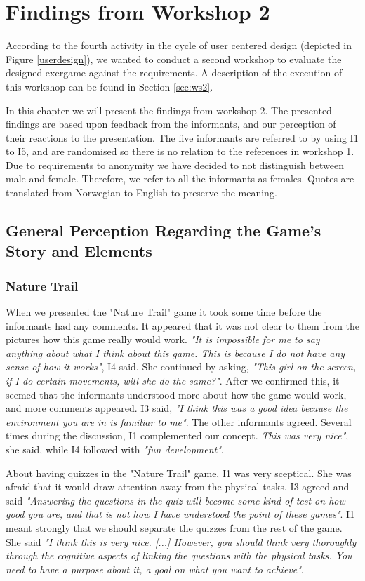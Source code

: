 \chapter{Findings from Workshop 2}
\label{chap:findW2}

According to the fourth activity in the cycle of user centered design (depicted in Figure \ref{userdesign}), we wanted to conduct a second workshop to evaluate the designed exergame against the requirements. A description of the execution of this workshop can be found in Section \ref{sec:ws2}. 

In this chapter we will present the findings from workshop 2. The presented findings are based upon feedback from the informants, and our perception of their reactions to the presentation. The five informants are referred to by using I1 to I5, and are randomised so there is no relation to the references in workshop 1. Due to requirements to anonymity we have decided to not distinguish between male and female. Therefore, we refer to all the informants as females. Quotes are translated from Norwegian to English to  preserve the meaning. 

\section{General Perception Regarding the Game's Story and Elements}

\subsection{Nature Trail}

When we presented the "Nature Trail" game it took some time before the informants had any comments. It appeared that it was not clear to them from the pictures how this game really would work. \emph{"It is impossible for me to say anything about what I think about this game. This is because I do not have any sense of how it works"}, I4 said. She continued by asking, \emph{"This girl on the screen, if I do certain movements, will she do the same?"}. After we confirmed this, it seemed that the informants understood more about how the game would work, and more comments appeared. I3 said, \emph{"I think this was a good idea because the environment you are in is familiar to me"}. The other informants agreed. Several times during the discussion, I1 complemented our concept. \emph{This was very nice"}, she said, while I4 followed with \emph{"fun development"}.  

About having quizzes in the "Nature Trail" game, I1 was very sceptical. She was afraid that it would draw attention away from the physical tasks. I3 agreed and said \emph{"Answering the questions in the quiz will become some kind of test on how good you are, and that is not how I have understood the point of these games"}. I1 meant strongly that we should separate the quizzes from the rest of the game. She said \emph{"I think this is very nice. [...] However, you should think very thoroughly through the cognitive aspects of linking the questions with the physical tasks. You need to have a purpose about it, a goal on what you want to achieve"}. 

